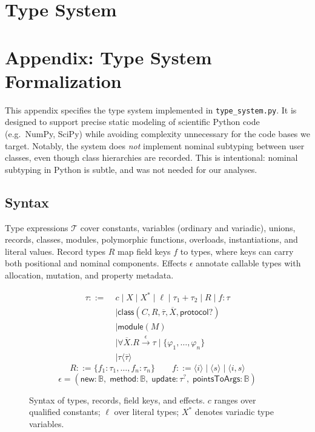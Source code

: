 \section{Type System}
\label{appendix:typesystem}
\section*{Appendix: Type System Formalization}

This appendix specifies the type system implemented in \texttt{type\_system.py}.  
It is designed to support precise static modeling of scientific Python code (e.g.\ NumPy, SciPy) while avoiding complexity unnecessary for the code bases we target.  
Notably, the system does \emph{not} implement nominal subtyping between user classes, even though class hierarchies are recorded. This is intentional: nominal subtyping in Python is subtle, and was not needed for our analyses.

\subsection{Syntax}

Type expressions $\mathcal{T}$ cover constants, variables (ordinary and variadic), unions, records, classes, modules, polymorphic functions, overloads, instantiations, and literal values.  
Record types $R$ map field keys $f$ to types, where keys can carry both positional and nominal components.  
Effects $\epsilon$ annotate callable types with allocation, mutation, and property metadata.

\begin{figure}[t]
\centering
\[
\begin{aligned}
\tau ::= \;& c \mid X \mid X^* \mid \ell \mid \tau_1 + \tau_2 \mid R \mid f : \tau \\
&\mid \mathsf{class}(C, R, \overline{\tau}, \overline{X}, \mathsf{protocol}?) \\
&\mid \mathsf{module}(M) \\
&\mid \forall \overline{X}.R \xrightarrow{\epsilon} \tau \mid \{\varphi_1, \ldots, \varphi_n\} \\
&\mid \tau\langle\overline{\tau}\rangle
\end{aligned}
\]
\[
R ::= \{f_1 : \tau_1, \ldots, f_n : \tau_n\}
\quad\quad
f ::= \langle i \rangle \mid \langle s \rangle \mid \langle i, s \rangle
\]
\[
\epsilon = (\mathsf{new} : \mathbb{B},\; \mathsf{method} : \mathbb{B},\; \mathsf{update} : \tau^?,\; \mathsf{pointsToArgs} : \mathbb{B})
\]
\caption{Syntax of types, records, field keys, and effects. $c$ ranges over qualified constants; $\ell$ over literal types; $X^*$ denotes variadic type variables.}
\label{fig:syntax}
\end{figure}

